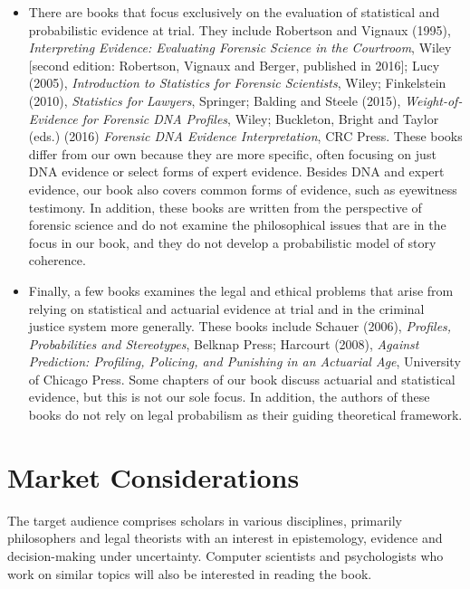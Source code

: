 \documentclass[
  10pt,
  dvipsnames,enabledeprecatedfontcommands]{scrartcl}
\begin{document}
\begin{itemize}
\item There are books that focus exclusively on the evaluation of statistical and probabilistic evidence at trial. They include Robertson and Vignaux (1995), \textit{Interpreting Evidence: Evaluating Forensic Science in the Courtroom}, Wiley [second edition:  Robertson, Vignaux and Berger, published in 2016];  Lucy (2005), \textit{Introduction to Statistics for Forensic Scientists}, Wiley;  Finkelstein (2010), \textit{Statistics for Lawyers}, Springer; Balding and Steele (2015), \textit{Weight-of-Evidence for Forensic DNA Profiles}, Wiley;  Buckleton, Bright and Taylor (eds.) (2016) \textit{Forensic DNA Evidence Interpretation}, CRC Press. These books differ from our own because they are more specific, often focusing on just  DNA evidence or select forms of expert evidence. Besides DNA and expert evidence, our book also covers common forms of evidence, such as eyewitness testimony. In addition, these books are written from the perspective of forensic science and do not examine the   philosophical issues that are in the focus in our book, and they do not develop a probabilistic model of story coherence.

\item  Finally, a few books examines the legal and ethical problems that arise from relying on statistical and actuarial evidence at trial and in the criminal justice system more generally. These books include Schauer (2006), \textit{Profiles, Probabilities and Stereotypes}, Belknap Press; Harcourt (2008), \textit{Against Prediction: Profiling, Policing, and Punishing in an Actuarial Age}, University of Chicago Press. Some chapters of our book discuss  actuarial and statistical evidence, but this is not our sole focus. In addition, the authors of these books do not rely on legal probabilism as their guiding theoretical framework.


\end{itemize}

\hypertarget{market-considerations}{%
\section{Market Considerations}\label{market-considerations}}

\normalsize

The target audience comprises scholars in various disciplines, primarily
philosophers and legal theorists with an interest in epistemology,
evidence and decision-making under uncertainty. Computer scientists and
psychologists who work on similar topics will also be interested in
reading the book.
\end{document}
